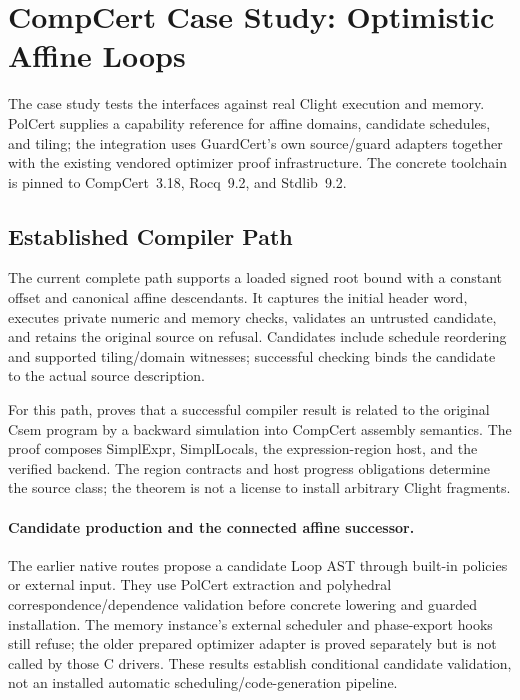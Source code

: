 \section{CompCert Case Study: Optimistic Affine Loops}
\label{sec:case-study}

The case study tests the interfaces against real Clight execution and memory.
PolCert supplies a capability reference for affine domains, candidate schedules,
and tiling; the integration uses GuardCert's own source/guard adapters together
with the existing vendored optimizer proof infrastructure. The concrete toolchain
is pinned to CompCert~3.18, Rocq~9.2, and Stdlib~9.2.

\subsection{Established Compiler Path}

The current complete path supports a loaded signed root bound with a constant
offset and canonical affine descendants. It captures the initial header word,
executes private numeric and memory checks, validates an untrusted candidate,
and retains the original source on refusal. Candidates include schedule
reordering and supported tiling/domain witnesses; successful checking binds the
candidate to the actual source description.

For this path,  proves that a
successful compiler result is related to the original Csem program by a
backward simulation into CompCert assembly semantics. The proof composes
SimplExpr, SimplLocals, the expression-region host, and the verified backend.
The region contracts and host progress obligations determine the source class;
the theorem is not a license to install arbitrary Clight fragments.

\paragraph{Candidate production and the connected affine successor.}
The earlier native routes propose a candidate Loop AST through built-in
policies or external input. They use PolCert extraction and polyhedral
correspondence/dependence validation before concrete lowering and guarded
installation. The memory instance's external scheduler and phase-export hooks
still refuse; the older prepared optimizer adapter is proved separately but is
not called by those C drivers. These results establish conditional candidate
validation, not an installed automatic scheduling/code-generation pipeline.

